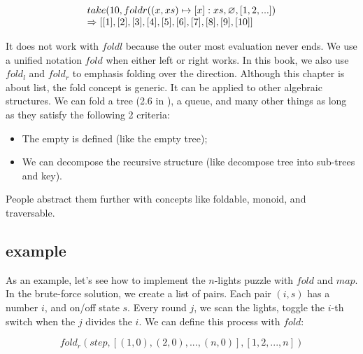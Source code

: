 \documentclass[b5paper]{article}
\begin{document}
\[
\begin{array}{l}
take(10, foldr((x, xs) \mapsto [x]:xs, \varnothing, [1, 2, ...]) \\
\Rightarrow [[1], [2], [3], [4], [5], [6], [7], [8], [9], [10]]
\end{array}
\]

It does not work with $foldl$ because the outer most evaluation never ends. We use a unified notation $fold$ when either left or right works. In this book, we also use $fold_l$ and $fold_r$ to emphasis folding over the direction. Although this chapter is about list, the fold concept is generic. It can be applied to other algebraic structures. We can fold a tree (2.6 in \cite{unplugged}), a queue, and many other things as long as they satisfy the following 2 criteria:

\begin{itemize}
\item The empty is defined (like the empty tree);
\item We can decompose the recursive structure (like decompose tree into sub-trees and key).
\end{itemize}

People abstract them further with concepts like foldable, monoid, and traversable.

\begin{Exercise}
\end{Exercise}

\subsection{example}

As an example, let's see how to implement the $n$-lights puzzle with $fold$ and $map$. In the brute-force solution, we create a list of pairs. Each pair $(i, s)$ has a number $i$, and on/off state $s$. Every round $j$, we scan the lights, toggle the $i$-th switch when the $j$ divides the $i$. We can define this process with $fold$:

\[
fold_r(step, [(1, 0), (2, 0), ..., (n, 0)], [1, 2, ..., n])
\]
\end{document}
